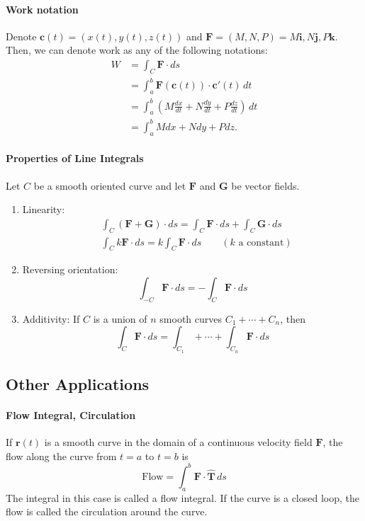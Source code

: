 \paragraph{Work notation}
Denote \(\textbf{c}(t) = (x(t), y(t), z(t))\) and \(\textbf{F}=(M,N,P) = M\textbf{i}, N\textbf{j}, P\textbf{k}\). Then, we can denote work as any of the following notations:
\begin{align*}
    W & = \int_C \textbf{F} \cdot ds \\
    & = \int_a^b \textbf{F}(\textbf{c}(t)) \cdot \textbf{c}'(t) \, dt \tag{Definition} \\
    & = \int_a^b \left( M\frac{dx}{dt} + N\frac{dy}{dt} + P\frac{dz}{dt} \right) \, dt\\
    & = \int_a^b Mdx + Ndy + Pdz. \tag{Alternative form}
\end{align*}

\paragraph{Properties of Line Integrals}
Let \(C\) be a smooth oriented curve and let \(\textbf{F}\) and \(\textbf{G}\) be vector fields.
\begin{enumerate}[label = (\roman*)]
    \item Linearity: 
    \begin{align*}
        & \int_C (\textbf{F} + \textbf{G}) \cdot ds = \int_C \textbf{F} \cdot ds + \int_C \textbf{G} \cdot ds \\
        & \int_C k\textbf{F} \cdot ds = k \int_C \textbf{F} \cdot ds \qquad (k \text{ a constant})
    \end{align*}
    \item Reversing orientation:
    \[\int_{-C} \textbf{F} \cdot ds = - \int_C \textbf{F} \cdot ds\]
    \item Additivity: If \(C\) is a union of \(n\) smooth curves \(C_1 + \cdots + C_n\), then
    \[\int_C \textbf{F} \cdot ds = \int_{C_1} + \cdots + \int_{C_n} \textbf{F} \cdot ds\]
\end{enumerate}

\subsection{Other Applications}
\paragraph{Flow Integral, Circulation}
If \(\textbf{r}(t)\) is a smooth curve in the domain of a continuous velocity field \(\textbf{F}\), the flow along the curve from \(t = a\) to \(t = b\) is
\[\text{Flow} = \int_a^b \textbf{F} \cdot \hat{\textbf{T}} \, ds\]
The integral in this case is called a flow integral. If the curve is a closed loop, the flow is called the circulation around the curve. 

